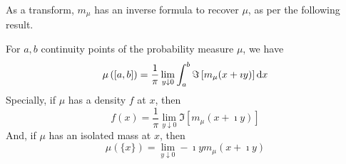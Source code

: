 As a transform, \(m_{\mu}\) has an inverse formula to recover \(\mu\), as per the following result.

\begin{theorem}\label{thm:inverse-stieltjes-transform}
	For \(a,b\) continuity points of the probability measure \(\mu\), we have
	\begin{equation}
		\mu\left([a,b]\right)=\frac{1}{\pi}\lim_{y\downarrow 0}\int_{a}^{b}\Im\left[m_{\mu}(x+\imath y)\right]\mathop{}\!\mathrm{d} x
	\end{equation}
	Specially, if \(\mu\) has a density \(f\) at \(x\), then
	\begin{equation}
		f(x)=\frac{1}{\pi}\lim_{y\downarrow 0}\Im\left[m_{\mu}(x+\imath y)\right]
	\end{equation}
	And, if \(\mu\) has an isolated mass at \(x\), then
	\begin{equation}
		\mu(\{x\})=\lim_{y \downarrow 0}-\imath y m_{\mu}(x+\imath y)
	\end{equation}
\end{theorem}

